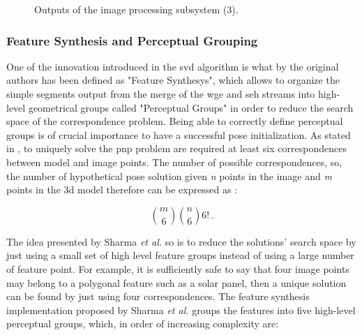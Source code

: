 \begin{figure}[htbp]
  \qquad
  \qquad
  \caption{Outputs of the image processing subsystem (3).}
  \label{fig:mergeStreams3}
\end{figure}

\subsubsection{Feature Synthesis and Perceptual Grouping}
One of the innovation introduced in the \acrshort{svd} algorithm is what by the original authors has been defined as "Feature Synthesys", which allows to organize the simple segments output from the merge of the \acrshort{wge} and \acrshort{seh} streams into high-level geometrical groups called "Perceptual Groups" in order to reduce the search space of the correspondence problem. Being able to correctly define perceptual groups is of crucial importance to have a successful pose initialization.
As stated in \cite{10.1145/358669.358692}, to uniquely solve the \acrshort{pnp} problem are required at least six correspondences between model and image points. The number of possible correspondences, so, the number of hypothetical pose solution given \textit{n} points in the image and \textit{m} points in the \acrshort{3d} model therefore can be expressed as \cite{Sharma2018}:

\begin{equation*}
  \binom{m}{6} \binom{n}{6} 6! \,.
\end{equation*}

The idea presented by Sharma \textit{et al.} so is to reduce the solutions' search space by just using a small set of high level feature groups instead of using a large number of feature point. For example, it is sufficiently safe to say that four image points may belong to a polygonal feature such as a solar panel, then a unique solution can be found by just using four correspondences. The feature synthesis implementation proposed by Sharma \textit{et al.} groups the features into five high-level perceptual groups, which, in order of increasing complexity are:


